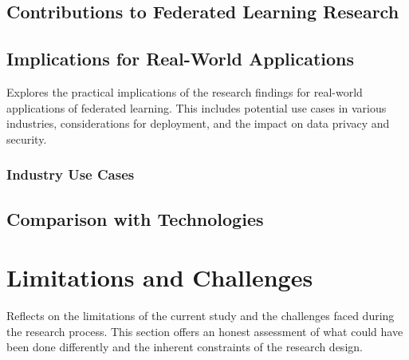 \subsection{Contributions to Federated Learning Research}
\subsection{Implications for Real-World Applications}
Explores the practical implications of the research findings for real-world applications of federated learning. This includes potential use cases in various industries, considerations for deployment, and the impact on data privacy and security.
\subsubsection{Industry Use Cases}
\subsection{Comparison with Technologies}
\section{Limitations and Challenges}
Reflects on the limitations of the current study and the challenges faced during the research process. This section offers an honest assessment of what could have been done differently and the inherent constraints of the research design.

